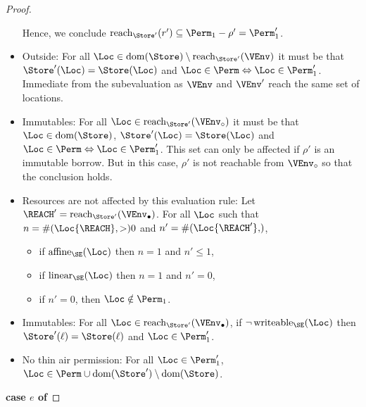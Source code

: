 \begin{proof}
\begin{itemize}
    Hence, we conclude  $\Reach{\Store'}{r'} \subseteq \Perm_1- \rho'
    = \Perm_1'$.
  \item Outside: For all $\Loc \in \Dom{\Store} \setminus
    \Reach{\Store'}{\VEnv}$ it must be that 
    $\Store' (\Loc) = \Store (\Loc)$
    and $\Loc\in\Perm \Leftrightarrow \Loc\in\Perm_1'$. Immediate from
    the subevaluation as $\VEnv$ and $\VEnv'$ reach the same set of locations.
  \item Immutables: For all $\Loc \in
    \Reach{\Store'}{\ImmutableBorrows{\VEnv}}$ it must be that
    $\Loc\in\Dom\Store$, 
    $\Store' (\Loc) = \Store (\Loc)$
    and $\Loc\in\Perm \Leftrightarrow \Loc\in\Perm_1'$.
    This set can only be affected if $\rho'$ is an immutable
    borrow. But in this case, $\rho'$ is not reachable from
    $\ImmutableBorrows\VEnv$ so that the conclusion holds.
  \item Resources are not affected by this evaluation rule:
    Let $\REACH' =\Reach{\Store'}{\Active{\VEnv}}$.
    For all $\Loc$ such that $n= \MultiNumber\Loc{\REACH} >0$ and $n' =
    \MultiNumber\Loc{\REACH'}$, 
    \begin{itemize}
    \item if $\Affine{\SE}\Loc$ then $n=1$ and $n'\le 1$,
    \item if $\Linear{\SE}\Loc$ then $n=1$ and $n' = 0$,
    \item if $n'=0$, then $\Loc\notin\Perm_1$.
    \end{itemize}
  \item Immutables: For all $\Loc \in \Reach
    {\Store'}{\Active{\VEnv}}$, if $\neg\Writeable{\SE}\Loc$ then
    $\Store' (\ell) = \Store (\ell)$ and $\Loc\in \Perm_1'$.
  \item No thin air permission: For all $\Loc\in \Perm_1'$, $\Loc
    \in \Perm \cup  \Dom{\Store'} \setminus \Dom{\Store}$.
  \end{itemize}
  \clearpage{}
  \textbf{case $e$ of}


\end{proof}
